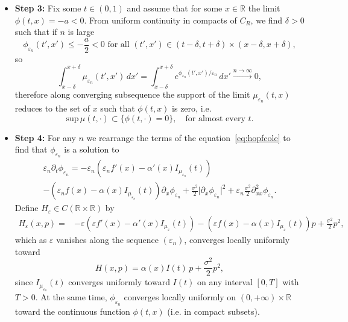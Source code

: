 \documentclass[onefignum,onetabnum]{siamart190516}
\newcommand{\R}{\mathbb{R}}
\newcommand{\1}{\mathbbm{1}}
\newcommand{\eps}{\varepsilon}
\begin{document}
\begin{itemize}
\item \textbf{Step 3:} Fix some $t\in (0,1)$ and assume that for some $x\in\R$ the limit $\phi(t,x)=-a<0$. From uniform continuity in compacts of $C_R$, we find $\delta>0$ such that if $n$ is large
$$
\phi_{\eps_n}(t',x')\leq -\frac a2<0\text{ for all }(t',x')\in (t-\delta,t+\delta)\times (x-\delta,x+\delta),
$$
so
$$
\int_{x-\delta}^{x+\delta} \mu_{\eps_n}(t',x')\,dx'=\int_{x-\delta}^{x+\delta} e^{\phi_{\eps_n}(t',x')/\eps_n}\,dx'\xrightarrow{n\rightarrow\infty}0,
$$
therefore along converging subsequence the support of the limit $\mu_{\eps_n}(t,x)$ reduces to the set of $x$ such that $\phi(t,x)$ is zero, i.e.
$$
\text{sup}\,\mu(t,\cdot)\subset \{\phi(t,\cdot)=0\},\quad\text{for almost every $t$.}
$$
\item \textbf{Step 4:} For any $n$ we rearrange the terms of the equation~\eqref{eq:hopfcole} to find that $\phi_{\eps_n}$ is a solution to
\begin{multline*}
\eps_n\partial_t\phi_{\eps_n} = -\eps_n\left(\eps_n f'(x) - \alpha'(x)I_{\mu_{\eps_n}}(t) \right)
\\
-  \left(\eps_n f(x)- \alpha(x) I_{\mu_{\eps_n
}}(t)\right)\partial_x\phi_{\eps_n} + \frac{\sigma^2}{2} \vert \partial_x \phi_{\eps_n} \vert^2  + \eps_n\frac {\sigma^2}{2} \partial_{xx}^2 \phi_{\eps_n}.
\end{multline*}
Define $H_\eps\in C(\R\times \R)$ by
\begin{align*}
H_\eps(x,p) =& -\eps\left(\eps f'(x) - \alpha'(x)I_{\mu_{\eps}}(t) \right)
-  \left(\eps f(x)- \alpha(x) I_{\mu_{\eps
}}(t)\right)p+ \frac{\sigma^2}{2} p^2,
\end{align*}
which as $\eps$ vanishes along the sequence $(\eps_n)$, converges locally uniformly toward
$$
H(x,p) = \alpha(x)I(t)\,p+\frac{\sigma^2}{2}p^2,
$$
since $I_{\mu_{\eps_n}}(t)$ converges uniformly toward $I(t)$ on any interval $[0,T]$ with $T>0$. At the same time, $\phi_{\eps_n}$ converges locally uniformly on $(0,+\infty)\times\R$ toward the continuous function $\phi(t,x)$ (i.e. in compact subsets).


\end{itemize}
\end{document}
